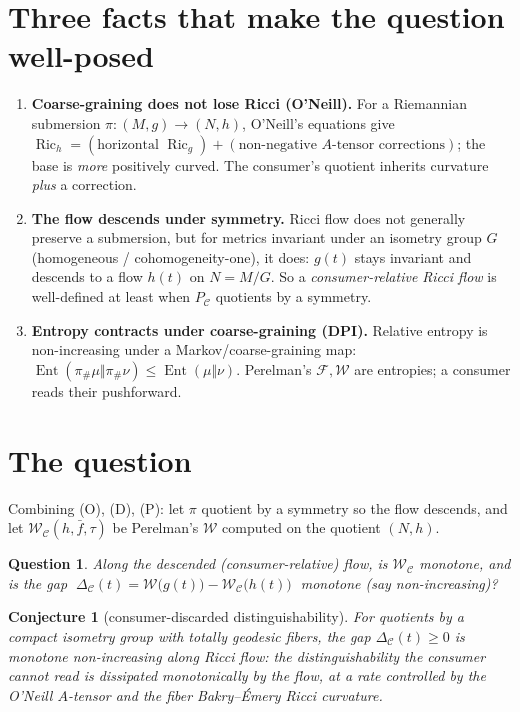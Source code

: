 \documentclass[11pt]{article}
\newtheorem{conjecture}{Conjecture}
\newtheorem{question}{Question}
\newcommand{\Ric}{\operatorname{Ric}}
\newcommand{\Ent}{\operatorname{Ent}}
\newcommand{\PC}{P_{\mathcal C}}
\begin{document}
\section{Three facts that make the question well-posed}
\begin{enumerate}
\item[(O)] \textbf{Coarse-graining does not lose Ricci (O'Neill).} For a
Riemannian submersion $\pi:(M,g)\to(N,h)$, O'Neill's equations give
$\Ric_h = (\text{horizontal }\Ric_g) + (\text{non-negative }A\text{-tensor
corrections})$; the base is \emph{more} positively curved. The consumer's
quotient inherits curvature \emph{plus} a correction.
\item[(D)] \textbf{The flow descends under symmetry.} Ricci flow does not
generally preserve a submersion, but for metrics invariant under an isometry
group $G$ (homogeneous / cohomogeneity-one), it does: $g(t)$ stays invariant and
descends to a flow $h(t)$ on $N=M/G$. So a \emph{consumer-relative Ricci flow} is
well-defined at least when $\PC$ quotients by a symmetry.
\item[(P)] \textbf{Entropy contracts under coarse-graining (DPI).} Relative
entropy is non-increasing under a Markov/coarse-graining map:
$\Ent(\pi_\#\mu\Vert\pi_\#\nu)\le\Ent(\mu\Vert\nu)$. Perelman's
$\mathcal F,\mathcal W$ are entropies; a consumer reads their pushforward.
\end{enumerate}

\section{The question}
Combining (O), (D), (P): let $\pi$ quotient by a symmetry so the flow descends,
and let $\mathcal W_{\mathcal C}(h,\bar f,\tau)$ be Perelman's $\mathcal W$
computed on the quotient $(N,h)$.

\begin{question}\label{q:mono}
Along the descended (consumer-relative) flow, is $\mathcal W_{\mathcal C}$
monotone, and is the \emph{gap}
$\;\Delta_{\mathcal C}(t)=\mathcal W\big(g(t)\big)-\mathcal W_{\mathcal C}\big(h(t)\big)\;$
monotone (say non-increasing)?
\end{question}

\begin{conjecture}[consumer-discarded distinguishability]\label{c:gap}
For quotients by a compact isometry group with totally geodesic fibers, the gap
$\Delta_{\mathcal C}(t)\ge0$ is monotone non-increasing along Ricci flow: the
distinguishability the consumer cannot read is dissipated monotonically by the
flow, at a rate controlled by the O'Neill $A$-tensor and the fiber Bakry--\'Emery
Ricci curvature.
\end{conjecture}
\end{document}
